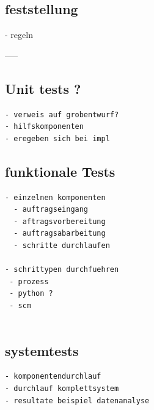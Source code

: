 \subsection{feststellung}
 - regeln


-----

\subsection{Unit tests ?}


\begin{verbatim}
- verweis auf grobentwurf?
- hilfskomponenten
- eregeben sich bei impl
\end{verbatim}

\subsection{funktionale Tests}

\begin{verbatim}
- einzelnen komponenten
  - auftragseingang
  - aftragsvorbereitung
  - auftragsabarbeitung
  - schritte durchlaufen

- schrittypen durchfuehren
 - prozess
 - python ?
 - scm


\end{verbatim}

\subsection{systemtests}

\begin{verbatim}
- komponentendurchlauf
- durchlauf komplettsystem
- resultate beispiel datenanalyse

\end{verbatim}


